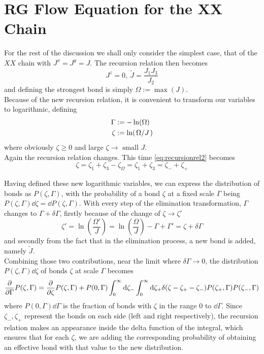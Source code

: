 \documentclass[../sdrg,../../main.tex]{subfiles}
\begin{document}
\section{RG Flow Equation for the XX Chain}

For the rest of the discussion we shall only consider the simplest case, that of the $XX$ chain with $J^{x}=J^{y}=J$. The recursion relation then becomes
\begin{equation}
\label{eq:recursionrel2}
    J^{z} = 0,\ \tilde{J}= \frac{J_{1}J_{3}}{J_{2}}
\end{equation}
and defining the strongest bond is simply $\Omega := \max(J)$.\\

Because of the new recursion relation, it is convenient to transform our variables to logarithmic, defining
\begin{equation}
\begin{split}
    \Gamma &:= -\ln(\Omega)\\
    \zeta &:= \ln(\flatfrac{\Omega}{J})
\end{split}
\end{equation}
where obviously $\zeta \ge 0$ and large $\zeta \rightarrow \text{ small } J$.\\

Again the recursion relation changes. This time \eqref{eq:recursionrel2} becomes
\begin{equation}
    \zeta = \zeta_{1}+\zeta_{3}-\zeta_{\Omega} = \zeta_{1}+\zeta_{3}=\zeta_{-}+\zeta_{+}
\end{equation}

Having defined these new logarithmic variables, we can express the distribution of bonds as $P(\zeta,\Gamma)$, with the probability of a bond $\zeta$ at a fixed scale $\Gamma$ being $P(\zeta,\Gamma)\dd \zeta=\dd P(\zeta,\Gamma)$. With every step of the elimination transformation, $\Gamma$ changes to $\Gamma + \delta\Gamma$, firstly because of the change of $\zeta \to \zeta'$
\begin{equation}
    \zeta' = \ln(\frac{\Omega'}{J}) = \ln(\frac{\Omega}{J}) - \Gamma + \Gamma' = \zeta + \delta\Gamma
\end{equation}
and secondly from the fact that in the elimination process, a new bond is added, namely $\tilde{J}$.\\

Combining those two contributions, near the limit where $\delta\Gamma\to 0$, the distribution $P(\zeta,\Gamma)\dd\zeta$ of bonds $\zeta$ at scale $\Gamma$ becomes
\begin{equation}
    \pdv{\Gamma}P(\zeta,\Gamma) = \pdv{\zeta}P(\zeta,\Gamma) + P(0,\Gamma)\int_{0}^{\infty}\dd\zeta_{-}\int_{0}^{\infty}\dd\zeta_{+}\delta(\zeta-\zeta_{+}-\zeta_{-})P(\zeta_{+},\Gamma)P(\zeta_{-},\Gamma)
\end{equation}
where $P(0,\Gamma)\dd\Gamma$ is the fraction of bonds with $\zeta$ in the range $0\text{ to } \dd\Gamma$. Since $\zeta_{-}, \zeta_{+}$ represent the bonds on each side (left and right respectively), the recursion relation makes an appearance inside the delta function of the integral, which ensures that for each $\zeta$, we are adding the corresponding probability of obtaining an effective bond with that value to the new distribution.
\end{document}
